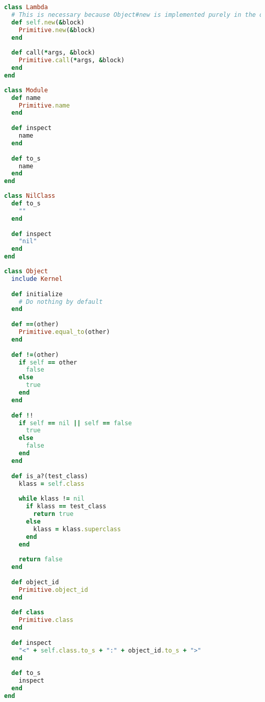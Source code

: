 \begin{lstlisting}[title={\small\ttfamily\bfseries kernel/lambda.carat},language=Ruby]
class Lambda
  # This is necessary because Object#new is implemented purely in the object language
  def self.new(&block)
    Primitive.new(&block)
  end
  
  def call(*args, &block)
    Primitive.call(*args, &block)
  end
end

\end{lstlisting}
\begin{lstlisting}[title={\small\ttfamily\bfseries kernel/module.carat},language=Ruby]
class Module
  def name
    Primitive.name
  end
  
  def inspect
    name
  end
  
  def to_s
    name
  end
end

\end{lstlisting}
\begin{lstlisting}[title={\small\ttfamily\bfseries kernel/nil\_class.carat},language=Ruby]
class NilClass
  def to_s
    ""
  end
  
  def inspect
    "nil"
  end
end

\end{lstlisting}
\begin{lstlisting}[title={\small\ttfamily\bfseries kernel/object.carat},language=Ruby]
class Object
  include Kernel
  
  def initialize
    # Do nothing by default
  end
  
  def ==(other)
    Primitive.equal_to(other)
  end
  
  def !=(other)
    if self == other
      false
    else
      true
    end
  end
  
  def !!
    if self == nil || self == false
      true
    else
      false
    end
  end
  
  def is_a?(test_class)
    klass = self.class
    
    while klass != nil
      if klass == test_class
        return true
      else
        klass = klass.superclass
      end
    end
    
    return false
  end
  
  def object_id
    Primitive.object_id
  end
  
  def class
    Primitive.class
  end
  
  def inspect
    "<" + self.class.to_s + ":" + object_id.to_s + ">"
  end
  
  def to_s
    inspect
  end
end

\end{lstlisting}
